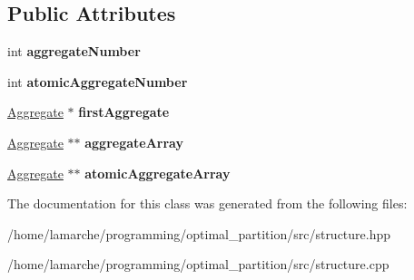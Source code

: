 \subsection*{Public Attributes}
\begin{DoxyCompactItemize}
\item 
\hypertarget{classStructure_a682a06309b5ee61c2748cfa647767922}{int {\bfseries aggregate\-Number}}\label{classStructure_a682a06309b5ee61c2748cfa647767922}

\item 
\hypertarget{classStructure_aeefae0ee6589529db98c11daa42a6359}{int {\bfseries atomic\-Aggregate\-Number}}\label{classStructure_aeefae0ee6589529db98c11daa42a6359}

\item 
\hypertarget{classStructure_a5926547e9f7996fbc50dc6d2c95311de}{\hyperlink{classAggregate}{Aggregate} $\ast$ {\bfseries first\-Aggregate}}\label{classStructure_a5926547e9f7996fbc50dc6d2c95311de}

\item 
\hypertarget{classStructure_a3499b465bca65bd0d0e6807bea397837}{\hyperlink{classAggregate}{Aggregate} $\ast$$\ast$ {\bfseries aggregate\-Array}}\label{classStructure_a3499b465bca65bd0d0e6807bea397837}

\item 
\hypertarget{classStructure_aa8f9b7e8ba6f13971ad221bbb61224da}{\hyperlink{classAggregate}{Aggregate} $\ast$$\ast$ {\bfseries atomic\-Aggregate\-Array}}\label{classStructure_aa8f9b7e8ba6f13971ad221bbb61224da}

\end{DoxyCompactItemize}


The documentation for this class was generated from the following files\-:\begin{DoxyCompactItemize}
\item 
/home/lamarche/programming/optimal\-\_\-partition/src/structure.\-hpp\item 
/home/lamarche/programming/optimal\-\_\-partition/src/structure.\-cpp\end{DoxyCompactItemize}
